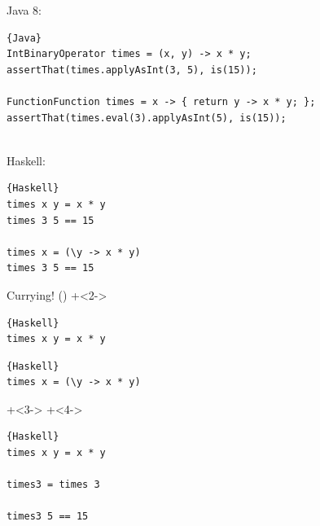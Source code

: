 \begin{frame}[fragile]{}
Java 8: 
\begin{lstlisting}{Java}
IntBinaryOperator times = (x, y) -> x * y;
assertThat(times.applyAsInt(3, 5), is(15));

FunctionFunction times = x -> { return y -> x * y; };
assertThat(times.eval(3).applyAsInt(5), is(15));
\end{lstlisting}
~\\
Haskell: 
\begin{lstlisting}{Haskell}
times x y = x * y
times 3 5 == 15

times x = (\y -> x * y)
times 3 5 == 15
\end{lstlisting}

\end{frame}

\begin{frame}[fragile]{Currying! ()}
\onslide+<2->
\begin{lstlisting}{Haskell}
times x y = x * y
\end{lstlisting}

\begin{lstlisting}{Haskell}
times x = (\y -> x * y)
\end{lstlisting}

\onslide+<3->
\vfill
\onslide+<4->
\begin{lstlisting}{Haskell}
times x y = x * y

times3 = times 3

times3 5 == 15
\end{lstlisting}


\end{frame}

